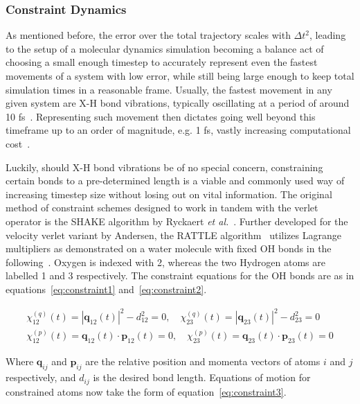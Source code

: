 \documentclass[11pt]{article}
\begin{document}
\subsubsection{Constraint Dynamics}
As mentioned before, the error over the total trajectory scales with $\Delta t^2$, leading to the setup of a molecular dynamics simulation becoming a balance act of choosing a small enough timestep to accurately represent even the fastest movements of a system with low error, while still being large enough to keep total simulation times in a reasonable frame. Usually, the fastest movement in any given system are X-H bond vibrations, typically oscillating at a period of around 10 fs~\cite{Wang2019}. Representing such movement then dictates going well beyond this timeframe up to an order of magnitude, e.g. 1 fs, vastly increasing computational cost~\cite{Braun2019}.
\\ \par \noindent Luckily, should X-H bond vibrations be of no special concern, constraining certain bonds to a pre-determined length is a viable and commonly used way of increasing timestep size without losing out on vital information. The original method of constraint schemes designed to work in tandem with the verlet operator is the SHAKE algorithm by Ryckaert \textit{et al.}~\cite{Ryckaert1977}. Further developed for the velocity verlet variant by Andersen, the RATTLE algorithm~\cite{Andersen1983} utilizes Lagrange multipliers as demonstrated on a water molecule with fixed OH bonds in the following~\cite{Allen2017}. Oxygen is indexed with 2, whereas the two Hydrogen atoms are labelled 1 and 3 respectively. The constraint equations for the OH bonds are as in equations~\ref{eq:constraint1} and~\ref{eq:constraint2}.

\begin{align}
  \chi^{(q)}_{12}(t) = |\mathbf{q}_{12}(t)|^2 - d^2_{12} = 0, \quad \chi^{(q)}_{23}(t) = |\mathbf{q}_{23}(t)|^2 - d^2_{23} = 0
  \label{eq:constraint1} \\
  \chi^{(p)}_{12}(t) = \mathbf{q}_{12}(t)\cdot\mathbf{p}_{12}(t) = 0, \quad \chi^{(p)}_{23}(t) = \mathbf{q}_{23}(t)\cdot\mathbf{p}_{23}(t) = 0
  \label{eq:constraint2}
\end{align}

\bigskip

\noindent Where $\mathbf{q}_{ij}$ and $\mathbf{p}_{ij}$ are the relative position and momenta vectors of atoms $i$ and $j$ respectively, and $d_{ij}$ is the desired bond length. Equations of motion for constrained atoms now take the form of equation~\ref{eq:constraint3}.
\end{document}
